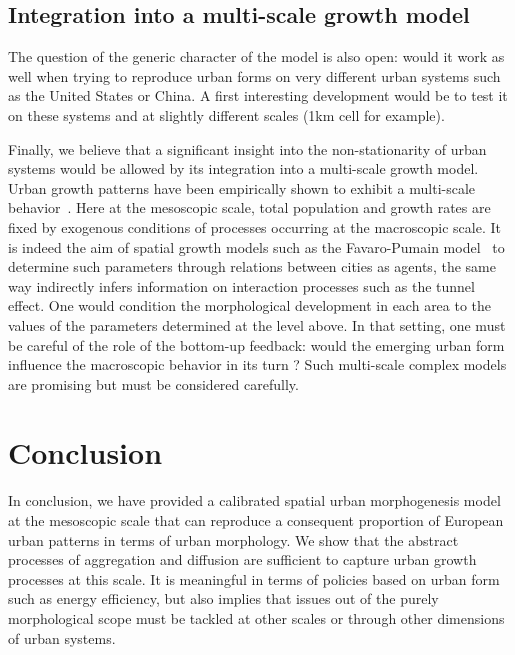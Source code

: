 \documentclass[10pt,letterpaper]{article}
\begin{document}
\subsection*{Integration into a multi-scale growth model}

The question of the generic character of the model is also open: would it work as well when trying to reproduce urban forms on very different urban systems such as the United States or China. A first interesting development would be to test it on these systems and at slightly different scales (1km cell for example).

Finally, we believe that a significant insight into the non-stationarity of urban systems would be allowed by its integration into a multi-scale growth model. Urban growth patterns have been empirically shown to exhibit a multi-scale behavior~\cite{zhang2013identifying}. Here at the mesoscopic scale, total population and growth rates are fixed by exogenous conditions of processes occurring at the macroscopic scale. It is indeed the aim of spatial growth models such as the Favaro-Pumain model~\cite{favaro2011gibrat} to determine such parameters through relations between cities as agents, the same way \cite{raimbault2018indirect} indirectly infers information on interaction processes such as the tunnel effect. One would condition the morphological development in each area to the values of the parameters determined at the level above. In that setting, one must be careful of the role of the bottom-up feedback: would the emerging urban form influence the macroscopic behavior in its turn ? Such multi-scale complex models are promising but must be considered carefully.


\section*{Conclusion}


In conclusion, we have provided a calibrated spatial urban morphogenesis model at the mesoscopic scale that can reproduce a consequent proportion of European urban patterns in terms of urban morphology. We show that the abstract processes of aggregation and diffusion are sufficient to capture urban growth processes at this scale. It is meaningful in terms of policies based on urban form such as energy efficiency, but also implies that issues out of the purely morphological scope must be tackled at other scales or through other dimensions of urban systems.
\end{document}
